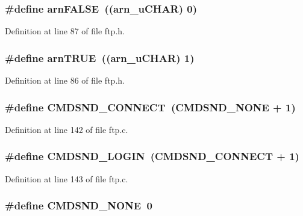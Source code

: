 \hypertarget{group__ftp_ga794b8af31b90186c33457a23fda0e759}{
\subsubsection[{arnFALSE}]{\setlength{\rightskip}{0pt plus 5cm}\#define arnFALSE~(({\bf arn\_\-uCHAR}) 0)}}
\label{group__ftp_ga794b8af31b90186c33457a23fda0e759}


Definition at line 87 of file ftp.h.

\hypertarget{group__ftp_ga055af4196bea1958758ca64e79eb7f34}{
\subsubsection[{arnTRUE}]{\setlength{\rightskip}{0pt plus 5cm}\#define arnTRUE~(({\bf arn\_\-uCHAR}) 1)}}
\label{group__ftp_ga055af4196bea1958758ca64e79eb7f34}


Definition at line 86 of file ftp.h.

\hypertarget{group__ftp_gaf25fc10c49d68867d1e496bccc9f0cd9}{
\subsubsection[{CMDSND\_\-CONNECT}]{\setlength{\rightskip}{0pt plus 5cm}\#define CMDSND\_\-CONNECT~(CMDSND\_\-NONE + 1)}}
\label{group__ftp_gaf25fc10c49d68867d1e496bccc9f0cd9}


Definition at line 142 of file ftp.c.

\hypertarget{group__ftp_gab8d23bf318a17f220349744e7f6b1f2d}{
\subsubsection[{CMDSND\_\-LOGIN}]{\setlength{\rightskip}{0pt plus 5cm}\#define CMDSND\_\-LOGIN~(CMDSND\_\-CONNECT + 1)}}
\label{group__ftp_gab8d23bf318a17f220349744e7f6b1f2d}


Definition at line 143 of file ftp.c.

\hypertarget{group__ftp_ga9e14673f34cb499027401340dea9b9e2}{
\subsubsection[{CMDSND\_\-NONE}]{\setlength{\rightskip}{0pt plus 5cm}\#define CMDSND\_\-NONE~0}}
\label{group__ftp_ga9e14673f34cb499027401340dea9b9e2}


